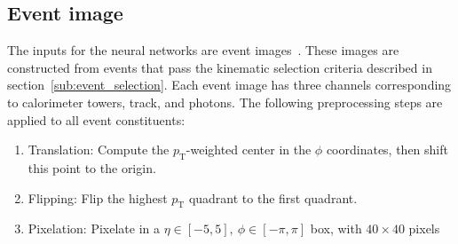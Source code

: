 \documentclass[12pt]{article}
\begin{document}
    \subsection{Event image}%
    \label{sub:event_image}
        The inputs for the neural networks are event images~\cite{Kasieczka:2019dbj,deOliveira:2015xxd, Kasieczka2017nv}. These images are constructed from events that pass the kinematic selection criteria described in section~\ref{sub:event_selection}. Each event image has three channels corresponding to calorimeter towers, track, and photons. The following preprocessing steps are applied to all event constituents:
        \begin{enumerate}
            \item Translation: Compute the $p_{\text{T}}$-weighted center in the $\phi$ coordinates, then shift this point to the origin.
            \item Flipping: Flip the highest $p_{\text{T}}$ quadrant to the first quadrant.
            \item Pixelation: Pixelate in a $\eta \in [-5, 5],\ \phi \in [-\pi, \pi]$ box, with $40 \times 40$ pixels 
        \end{enumerate}
\end{document}
